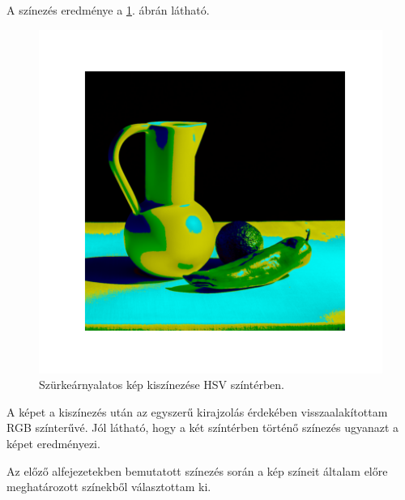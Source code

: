 A színezés eredménye a \ref{fig:colorized_hsv}. ábrán látható. 

\begin{figure}[h]
\centering
\includegraphics[scale=0.7]{images/colorized_hsv.png}
\caption{Szürkeárnyalatos kép kiszínezése HSV színtérben.}
\label{fig:colorized_hsv}
\end{figure}

A képet a kiszínezés után az egyszerű kirajzolás érdekében visszaalakítottam RGB színterűvé. Jól látható, hogy a két színtérben történő színezés ugyanazt a képet eredményezi.


Az előző alfejezetekben bemutatott színezés során a kép színeit általam előre meghatározott színekből választottam ki. 